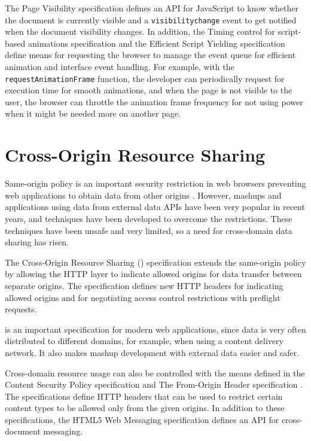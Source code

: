 The Page Visibility specification \cite{PageVisibility} defines an API
for JavaScript to know whether the document is currently visible and a
\texttt{visibilitychange} event to get notified when the document
visibility changes. In addition, the Timing control for script-based
animations specification \cite{TimingControl} and the Efficient Script
Yielding specification \cite{ScriptYielding} define means for
requesting the browser to manage the event queue for efficient
animation and interface event handling. For example, with the
\texttt{requestAnimationFrame} function, the developer can
periodically request for execution time for smooth animations, and
when the page is not visible to the user, the browser can throttle the
animation frame frequency for not using  power when it might
be needed more on another page.

\section{Cross-Origin Resource Sharing}

Same-origin policy is an important security restriction in web
browsers preventing web applications to obtain data from other origins
\cite{CORS}. However, mashups and applications using data from
external data APIs have been very popular in recent years, and
techniques have been developed to overcome the restrictions. These
techniques have been unsafe and very limited, so a need for
cross-domain data sharing has risen.

The Cross-Origin Resource Sharing () specification
\cite{CORS} extends the same-origin policy by allowing the HTTP layer
to indicate allowed origins for data transfer between separate
origins. The specification defines new HTTP headers for indicating
allowed origins and for negotiating access control restrictions with
preflight requests.

 is an important specification for modern web applications,
since data is very often distributed to different domains, for
example, when using a content delivery network. It also makes mashup
development with external data easier and safer.

Cross-domain resource usage can also be controlled with the means
defined in the Content Security Policy specification
\cite{ContentSecurityPolicy} and The From-Origin Header specification
\cite{FromOriginHeader}. The specifications define HTTP headers that
can be used to restrict certain content types to be allowed only from
the given origins. In addition to these specifications, the HTML5 Web
Messaging specification \cite{WebMessaging} defines an API for
cross-document messaging.

